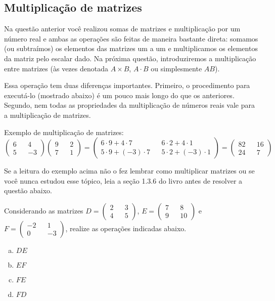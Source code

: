 \documentclass[main_estudante.tex]{subfiles}
\begin{document}
\subsection*{Multiplicação de matrizes}

Na questão anterior você realizou somas de matrizes e multiplicação por um número real e ambas as operações são feitas de maneira bastante direta: somamos (ou subtraímos) os elementos das matrizes um a um e multiplicamos os elementos da matriz pelo escalar dado. Na próxima questão, introduziremos a multiplicação entre matrizes (às vezes denotada $A \times B$, $A \cdot B$ ou simplesmente $AB$).

Essa operação tem duas diferenças importantes. Primeiro, o procedimento para executá-lo (mostrado abaixo) é um pouco mais longo do que os anteriores. Segundo, nem todas as propriedades da multiplicação de números reais vale para a multiplicação de matrizes.

\begin{caixaExemplo}
 \noindent  Exemplo de multiplicação de matrizes:
 $$ \begin{pmatrix} 6 && 4 \\ 5 && -3 \end{pmatrix} \begin{pmatrix} 9 && 2 \\ 7 && 1  \end{pmatrix} = \begin{pmatrix} 6 \cdot 9 + 4 \cdot 7 &&  6 \cdot2 + 4 \cdot 1 \\ 5 \cdot 9 + (-3) \cdot 7 && 5 \cdot 2 + (-3) \cdot 1 \end{pmatrix} = \begin{pmatrix} 82 &&  16 \\ 24 && 7 \end{pmatrix}$$
\end{caixaExemplo}

Se a leitura do exemplo acima não o fez lembrar como multiplicar matrizes ou se você nunca estudou esse tópico, leia a seção 1.3.6 do livro  antes de resolver a questão abaixo.

\begin{questao}
Considerando as matrizes $D=\begin{pmatrix} 2 && 3 \\ 4 && 5 \end{pmatrix}$, $E=\begin{pmatrix} 7 && 8 \\ 9 && 10 \end{pmatrix}$ e $F=\begin{pmatrix} -2 && 1 \\ 0 && -3 \end{pmatrix}$, realize as operações indicadas abaixo.
\begin{enumerate}[a)]
\item $DE$
\item $EF$
\item $FE$
\item $FD$
\end{enumerate}
\end{questao}
\end{document}
